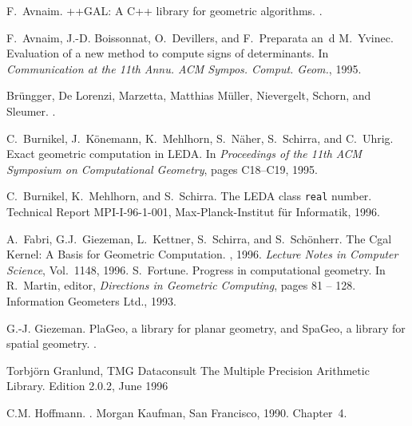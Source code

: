 
{
\begin{thebibliography}{AMC+}

F.~Avnaim.
++{G}{A}{L}: {A} {C}++ library for geometric algorithms.
.

F.~Avnaim, J.-D. Boissonnat, O.~Devillers, and F.~Preparata an~d M.~Yvinec.
\newblock Evaluation of a new method to compute signs of determinants.
\newblock In {\em Communication at the 11th Annu. ACM Sympos. Comput. Geom.},
  1995.

Br\"ungger, De Lorenzi, Marzetta, Matthias M\"uller, Nievergelt, Schorn,
and  Sleumer.
\newblock {}.

C.~Burnikel, J.~K\"onemann, K.~Mehlhorn, S.~N\"aher, S.~Schirra, and C.~Uhrig.
\newblock Exact geometric computation in {LEDA}.
\newblock In {\em Proceedings of the 11{th} ACM Symposium on Computational
  Geometry}, pages C18--C19, 1995.

C.~Burnikel, K.~Mehlhorn, and S.~Schirra.
\newblock The {LEDA} class {\tt real} number.
\newblock Technical Report MPI-I-96-1-001, Max-Planck-Institut f\"ur
  Informatik, 1996.

A.~Fabri, G.J.~Giezeman, L.~Kettner, S.~Schirra, and S.~Sch\"onherr.
\newblock The {\sc Cgal} Kernel: A Basis for Geometric Computation.
, 1996.  {\em Lecture Notes in Computer Science}, Vol.~1148, 1996.
S.~Fortune.
\newblock Progress in computational geometry.
\newblock In R.~Martin, editor, {\em Directions in Geometric Computing}, pages
  81 -- 128. Information Geometers Ltd., 1993.

G.-J. Giezeman.
\newblock Pla{G}eo, a library for planar geometry, and {S}pa{G}eo, a library
  for spatial geometry.
.


Torbj\"orn Granlund, TMG Dataconsult
\newblock The 
 Multiple Precision Arithmetic Library.
\newblock Edition 2.0.2, June 1996 


C.M. Hoffmann.
.
\newblock Morgan Kaufman, San Francisco, 1990.
\newblock Chapter~4.


\end{thebibliography}}
